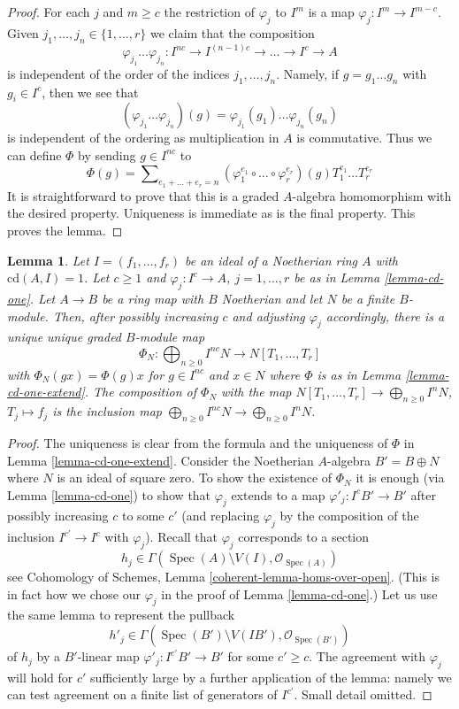 \documentclass[10pt,a4paper]{amsart}
\theoremstyle{plain}
\newtheorem{lemma}[subsection]{Lemma}
\theoremstyle{definition}
\theoremstyle{remark}
\numberwithin{equation}{subsection}
\def\Spec{\mathop{\mathrm{Spec}}}
\begin{document}
\begin{proof}
For each $j$ and $m \geq c$ the restriction of $\varphi_j$ to
$I^m$ is a map $\varphi_j : I^m \to I^{m - c}$.
Given $j_1, \ldots, j_n \in \{1, \ldots, r\}$ we claim that the
composition
$$
\varphi_{j_1} \ldots \varphi_{j_n} :
I^{nc} \to I^{(n - 1)c} \to \ldots \to I^c \to A
$$
is independent of the order of the indices $j_1, \ldots, j_n$.
Namely, if $g = g_1 \ldots g_n$ with $g_i \in I^c$, then
we see that
$$
(\varphi_{j_1} \ldots \varphi_{j_n})(g) =
\varphi_{j_1}(g_1) \ldots \varphi_{j_n}(g_n)
$$
is independent of the ordering as multiplication in $A$ is commutative.
Thus we can define $\Phi$ by sending $g \in I^{nc}$ to
$$
\Phi(g) = \sum\nolimits_{e_1 + \ldots + e_r = n}
(\varphi_1^{e_1} \circ \ldots \circ \varphi_r^{e_r})(g)
T_1^{e_1} \ldots T_r^{e_r}
$$
It is straightforward to prove that this is a graded $A$-algebra
homomorphism with the desired property. Uniqueness is immediate
as is the final property. This proves the lemma.
\end{proof}

\begin{lemma}
\label{lemma-cd-one-extend-to-module}
Let $I = (f_1, \ldots, f_r)$ be an ideal of a Noetherian ring $A$
with $\text{cd}(A, I) = 1$. Let $c \geq 1$ and $\varphi_j : I^c \to A$,
$j = 1, \ldots, r$ be as in Lemma \ref{lemma-cd-one}.
Let $A \to B$ be a ring map with $B$ Noetherian and let $N$ be
a finite $B$-module. Then, after possibly increasing $c$
and adjusting $\varphi_j$ accordingly, there is a unique
unique graded $B$-module map
$$
\Phi_N : \bigoplus\nolimits_{n \geq 0} I^{nc}N \to N[T_1, \ldots, T_r]
$$
with $\Phi_N(g x) = \Phi(g) x$ for $g \in I^{nc}$ and $x \in N$
where $\Phi$ is as in Lemma \ref{lemma-cd-one-extend}.
The composition of $\Phi_N$ with the map
$N[T_1, \ldots, T_r] \to \bigoplus_{n \geq 0} I^nN$,
$T_j \mapsto f_j$ is the inclusion map
$\bigoplus_{n \geq 0} I^{nc}N \to \bigoplus_{n \geq 0} I^nN$.
\end{lemma}

\begin{proof}
The uniqueness is clear from the formula and the uniqueness of $\Phi$ in
Lemma \ref{lemma-cd-one-extend}. Consider the Noetherian $A$-algebra
$B' = B \oplus N$ where $N$ is an ideal of square zero. To show
the existence of $\Phi_N$ it is enough
(via Lemma \ref{lemma-cd-one}) to show that $\varphi_j$ extends to
a map $\varphi'_j : I^cB' \to B'$ after possibly increasing $c$
to some $c'$ (and replacing $\varphi_j$ by the composition of the inclusion
$I^{c'} \to I^c$ with $\varphi_j$). Recall that $\varphi_j$ corresponds to a
section
$$
h_j \in \Gamma(\Spec(A) \setminus V(I), \mathcal{O}_{\Spec(A)})
$$
see Cohomology of Schemes, Lemma \ref{coherent-lemma-homs-over-open}.
(This is in fact how we chose our $\varphi_j$ in the proof of
Lemma \ref{lemma-cd-one}.) Let us use the same lemma to represent the pullback
$$
h'_j \in \Gamma(\Spec(B') \setminus V(IB'), \mathcal{O}_{\Spec(B')})
$$
of $h_j$ by a $B'$-linear map
$\varphi'_j : I^{c'}B' \to B'$ for some $c' \geq c$.
The agreement with $\varphi_j$ will hold for $c'$
sufficiently large by a further application of the lemma:
namely we can test agreement on a finite list of generators of $I^{c'}$.
Small detail omitted.
\end{proof}
\end{document}
